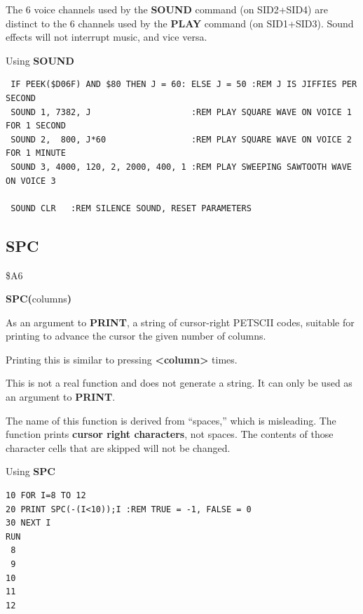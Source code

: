 \begin{description}[leftmargin=2cm,style=nextline]
               The 6 voice channels used by the {\bf SOUND} command (on
               SID2+SID4) are distinct to the 6 channels used by the {\bf
               PLAY} command (on SID1+SID3). Sound effects will not interrupt
               music, and vice versa.

\item [Examples:] Using {\bf SOUND}
\begin{tcolorbox}[colback=black,coltext=white]
\verbatimfont{\codefont}
\begin{verbatim}
 IF PEEK($D06F) AND $80 THEN J = 60: ELSE J = 50 :REM J IS JIFFIES PER SECOND
 SOUND 1, 7382, J                    :REM PLAY SQUARE WAVE ON VOICE 1 FOR 1 SECOND
 SOUND 2,  800, J*60                 :REM PLAY SQUARE WAVE ON VOICE 2 FOR 1 MINUTE
 SOUND 3, 4000, 120, 2, 2000, 400, 1 :REM PLAY SWEEPING SAWTOOTH WAVE ON VOICE 3

 SOUND CLR   :REM SILENCE SOUND, RESET PARAMETERS
\end{verbatim}
\end{tcolorbox}
\end{description}


\newpage
\subsection{SPC}
\begin{description}[leftmargin=2cm,style=nextline]
\item [Token:] \$A6
\item [Format:] {\bf SPC(}columns{\bf)}
\item [Returns:] As an argument to {\bf PRINT}, a string of cursor-right
               PETSCII codes, suitable for printing to advance the cursor the
               given number of columns.

               Printing this is similar to pressing \megakey{$\rightarrow$}
               {\bf <column>} times.

               This is not a real function and does not generate a string. It
               can only be used as an argument to {\bf PRINT}.

\item [Remarks:] The name of this function is derived from
                 ``spaces,'' which is misleading.
                 The function prints {\bf cursor right characters},
                 not spaces. The contents of those character
                 cells that are skipped will not be changed.

\item [Example:] Using {\bf SPC}
\begin{tcolorbox}[colback=black,coltext=white]
\verbatimfont{\codefont}
\begin{verbatim}
10 FOR I=8 TO 12
20 PRINT SPC(-(I<10));I :REM TRUE = -1, FALSE = 0
30 NEXT I
RUN
 8
 9
10
11
12
\end{verbatim}
\end{tcolorbox}
\end{description}

